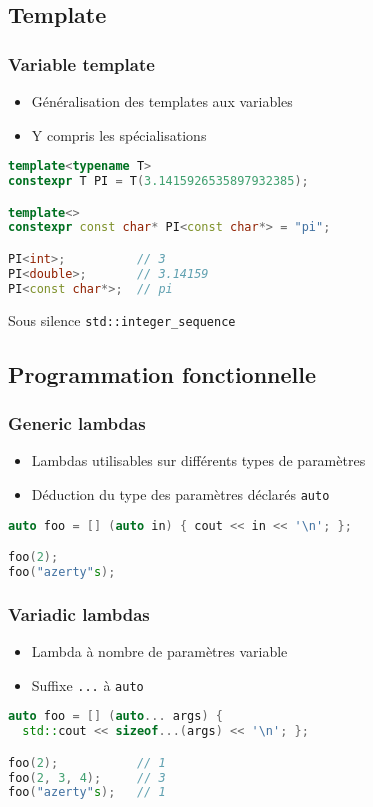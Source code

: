 \documentclass[C++.tex]{subfiles}
\begin{document}
\subsection*{Template}
\begin{frame}[fragile]
	\frametitle{Variable template}
	\begin{itemize}
		\item Généralisation des templates aux variables
		\item Y compris les spécialisations
	\end{itemize}

	\begin{lstlisting}[language=C++]
template<typename T>
constexpr T PI = T(3.1415926535897932385);

template<>
constexpr const char* PI<const char*> = "pi";

PI<int>;          // 3
PI<double>;       // 3.14159
PI<const char*>;  // pi\end{lstlisting}

	\begin{block}{Sous silence}
		\lstinline|std::integer_sequence|
	\end{block}
\end{frame}

\subsection*{Programmation fonctionnelle}
\begin{frame}[fragile]
	\frametitle{Generic lambdas}
	\begin{itemize}
		\item Lambdas utilisables sur différents types de paramètres
		\item Déduction du type des paramètres déclarés \lstinline|auto|
	\end{itemize}

	\begin{lstlisting}[language=C++]
auto foo = [] (auto in) { cout << in << '\n'; };

foo(2);
foo("azerty"s);\end{lstlisting}
\end{frame}

\begin{frame}[fragile]
	\frametitle{Variadic lambdas}
	\begin{itemize}
		\item Lambda à nombre de paramètres variable
		\item Suffixe \lstinline|...| à \lstinline|auto|
	\end{itemize}

	\begin{lstlisting}[language=C++]
auto foo = [] (auto... args) { 
  std::cout << sizeof...(args) << '\n'; };

foo(2);           // 1
foo(2, 3, 4);     // 3
foo("azerty"s);   // 1\end{lstlisting}
\end{frame}
\end{document}
